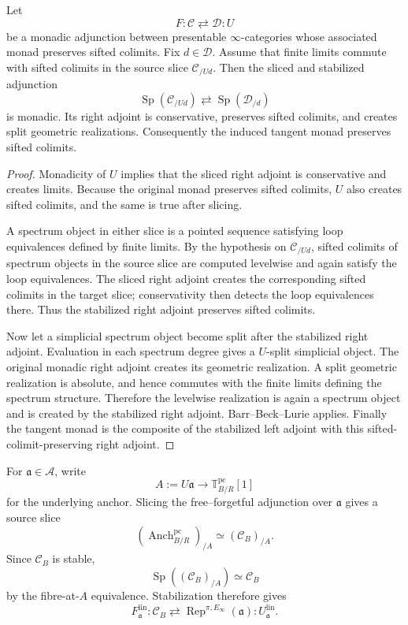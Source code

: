 \begin{lemma}
\label{lem:as-stabilized-monadicity}
Let
\[
    F:\mathcal C\rightleftarrows\mathcal D:U
\]
be a monadic adjunction between presentable $\infty$-categories whose
associated monad preserves sifted colimits.  Fix $d\in\mathcal D$.  Assume
that finite limits commute with sifted colimits in the source slice
$\mathcal C_{/Ud}$.  Then the sliced and stabilized adjunction
\[
    \operatorname{Sp}(\mathcal C_{/Ud})
    \rightleftarrows
    \operatorname{Sp}(\mathcal D_{/d})
\]
is monadic.  Its right adjoint is conservative, preserves sifted colimits,
and creates split geometric realizations.  Consequently the induced tangent
monad preserves sifted colimits.
\end{lemma}

\begin{proof}
Monadicity of $U$ implies that the sliced right adjoint is conservative and
creates limits.  Because the original monad preserves sifted colimits, $U$
also creates sifted colimits, and the same is true after slicing.

A spectrum object in either slice is a pointed sequence satisfying loop
equivalences defined by finite limits.  By the hypothesis on
$\mathcal C_{/Ud}$, sifted colimits of spectrum objects in the source slice
are computed levelwise and again satisfy the loop equivalences.  The sliced
right adjoint creates the corresponding sifted colimits in the target slice;
conservativity then detects the loop equivalences there.  Thus the stabilized
right adjoint preserves sifted colimits.

Now let a simplicial spectrum object become split after the stabilized right
adjoint.  Evaluation in each spectrum degree gives a $U$-split simplicial
object.  The original monadic right adjoint creates its geometric
realization.  A split geometric realization is absolute, and hence commutes
with the finite limits defining the spectrum structure.  Therefore the
levelwise realization is again a spectrum object and is created by the
stabilized right adjoint.  Barr--Beck--Lurie applies.  Finally the tangent
monad is the composite of the stabilized left adjoint with this
sifted-colimit-preserving right adjoint.
\end{proof}

\begin{construction}
\label{con:as-sliced-free-forgetful}
For $\mathfrak a\in\mathcal A$, write
\[
    A:=U\mathfrak a\longrightarrow
    \mathbb T_{B/R}^{\mathrm{pc}}[1]
\]
for the underlying anchor.  Slicing the free--forgetful adjunction over
$\mathfrak a$ gives a source slice
\[
    \left(
        \operatorname{Anch}_{B/R}^{\mathrm{pc}}
    \right)_{/A}
    \simeq
    (\mathcal C_B)_{/A}.
\]
Since $\mathcal C_B$ is stable,
\[
    \operatorname{Sp}
    \left((\mathcal C_B)_{/A}\right)
    \simeq
    \mathcal C_B
\]
by the fibre-at-$A$ equivalence.  Stabilization therefore gives
\[
\boxed{
    F_{\mathfrak a}^{\mathrm{lin}}:
    \mathcal C_B
    \rightleftarrows
    \operatorname{Rep}^{\pi,E_\infty}(\mathfrak a):
    U_{\mathfrak a}^{\mathrm{lin}}.
}
\]
\end{construction}

